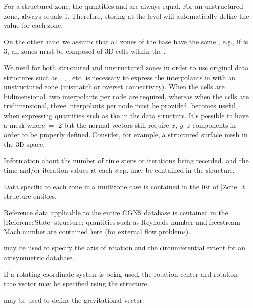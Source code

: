 For a structured zone, the quantities  and
 are always equal.
For an unstructured zone,  always equals 1.
Therefore, storing  at the  level
will automatically define the  value for each zone.

On the other hand we assume that all zones of the base have the same
, e.g., if  is 3, all zones
must be composed of 3D cells within the .

We need  for both structured and
unstructured zones in order to use original data structures
such as , ,
, etc.
 is necessary to express the interpolants in
 with an unstructured zone (mismatch or overset
connectivity).
When the cells are bidimensional, two interpolants per node are required,
whereas when the cells are tridimensional, three interpolants per node must
be provided.
 becomes useful when expressing quantities
such as the  in the  data structure.
It's possible to have a mesh where  $=$ 2 but the
normal vectors still require $x$, $y$, $z$ components in order to be
properly defined.
Consider, for example, a structured surface mesh in the 3D space.

Information about the number of time steps or iterations being recorded,
and the time and/or iteration values at each step, may be contained in
the  structure.

Data specific to each zone in a multizone case is contained in the
list of |Zone_t| structure entities.

Reference data applicable to the entire CGNS database is contained in the
|ReferenceState| structure; quantities such as Reynolds number and
freestream Mach number are contained here (for external flow problems).

 may be used to specify the axis of rotation and the
circumferential extent for an axisymmetric database.

If a rotating coordinate system is being used, the rotation
center and rotation rate vector may be specified using the
 structure.

 may be used to define the gravitational vector.

